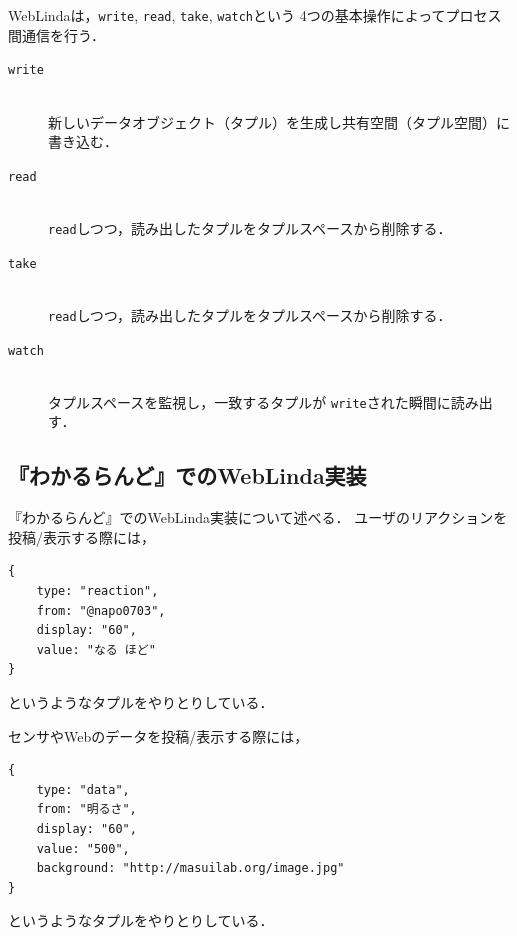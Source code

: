 WebLindaは，\texttt{write}, \texttt{read}, \texttt{take}, \texttt{watch}という
4つの基本操作によってプロセス間通信を行う．

\vspace{2mm}
\begin{description}
\item[\texttt{write}]\mbox{}\\
新しいデータオブジェクト（タプル）を生成し共有空間（タプル空間）に書き込む．
\item[\texttt{read}]\mbox{}\\
\texttt{read}しつつ，読み出したタプルをタプルスペースから削除する．
\item[\texttt{take}]\mbox{}\\
\texttt{read}しつつ，読み出したタプルをタプルスペースから削除する．
\item[\texttt{watch}]\mbox{}\\
タプルスペースを監視し，一致するタプルが
\texttt{write}された瞬間に読み出す．
\end{description}

\subsection{『わかるらんど』でのWebLinda実装}
『わかるらんど』でのWebLinda実装について述べる．
ユーザのリアクションを投稿/表示する際には，

\begin{lstlisting}
{
    type: "reaction",
    from: "@napo0703",
    display: "60",
    value: "なる ほど"
}
\end{lstlisting}
というようなタプルをやりとりしている．

センサやWebのデータを投稿/表示する際には，
\begin{lstlisting}
{
    type: "data",
    from: "明るさ",
    display: "60",
    value: "500",
    background: "http://masuilab.org/image.jpg"
}
\end{lstlisting}
というようなタプルをやりとりしている．

